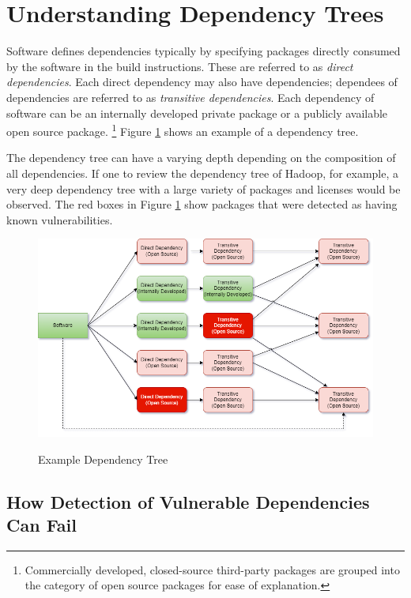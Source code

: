 \section{Understanding Dependency Trees}


Software defines dependencies typically by specifying packages directly
consumed by the software in the build instructions.  These are referred to as
\textit{direct dependencies}.  Each direct dependency may also have
dependencies; dependees of dependencies are referred to as 
\textit{transitive dependencies}.  Each dependency of software can be an
internally developed private package or a publicly available open source package.
\footnote{Commercially developed, closed-source third-party packages are grouped into the
category of open source packages for ease of explanation.}
Figure \ref{fig:dependency_tree} shows an example of a dependency tree.

The dependency tree can have a varying depth depending on the composition
of all dependencies.  If one to review the dependency tree of Hadoop, for
example, a very deep dependency tree with a large variety of packages and
licenses would be observed.  The red boxes in Figure \ref{fig:dependency_tree}
show packages that were detected as having known vulnerabilities.

\begin{figure}[h]
    \caption{Example Dependency Tree}
    \includegraphics[width=\textwidth]{graphics/dependency_tree.png}
    \label{fig:dependency_tree}
\end{figure}


\subsection{How Detection of Vulnerable Dependencies Can Fail}\label{sec:missing_vulnerable_dependencies}



